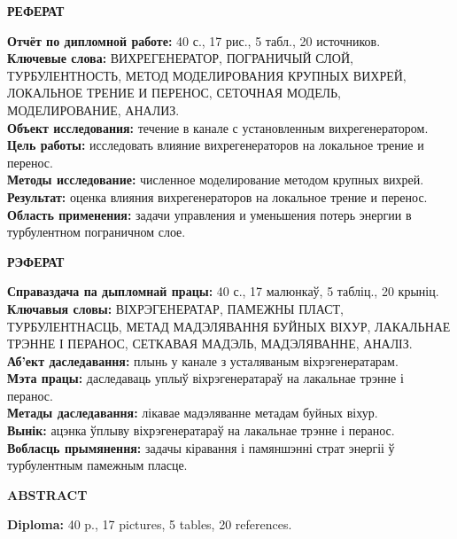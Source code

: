 \newpage
\tableofcontents
\newpage
\begin{center}
	\textbf{\MakeUppercase{реферат}}
\end{center}
\textbf{Отчёт по дипломной работе:} 40 с., 17 рис., 5 табл., 20 источников.\\
\textbf{Ключевые слова:} \MakeUppercase{вихрегенератор, пограничый слой, турбулентность, метод моделирования крупных вихрей, локальное трение и перенос, сеточная модель, моделирование, анализ}.\\
\textbf{Объект исследования:} течение в канале с установленным вихрегенератором.\\
\textbf{Цель работы:} исследовать влияние вихрегенераторов на локальное трение и перенос.\\
\textbf{Методы исследование:} численное моделирование методом крупных вихрей.\\
\textbf{Результат:} оценка влияния вихрегенераторов на локальное трение и перенос.\\
\textbf{Область применения:} задачи управления и уменьшения потерь энергии в турбулентном пограничном слое.\\
\newpage
\begin{center}
	\textbf{\MakeUppercase{рэферат}}
\end{center}
\textbf{Справаздача па дыпломнай працы:} 40 с., 17 малюнкаў, 5 табліц., 20 крыніц.\\
\textbf{Ключавыя словы:} \MakeUppercase{віхрэгенератар, памежны пласт, турбулентнасць, метад мадэлявання буйных віхур, лакальнае трэнне і перанос, сеткавая мадэль, мадэляванне, аналіз}.\\
\textbf{Аб'ект даследавання:} плынь у канале з усталяваным віхрэгенератарам.\\
\textbf{Мэта працы:} даследаваць уплыў віхрэгенератараў на лакальнае трэнне і перанос.\\
\textbf{Метады даследавання:} лікавае мадэляванне метадам буйных віхур.\\
\textbf{Вынік:} ацэнка ўплыву віхрэгенератараў на лакальнае трэнне і перанос.\\
\textbf{Вобласць прымянення:} задачы кіравання і памяншэнні страт энергіі ў турбулентным памежным пласце.\\
\newpage
\begin{center}
	\textbf{\MakeUppercase{abstract}}
\end{center}
\textbf{Diploma:} 40 p., 17 pictures, 5 tables, 20 references.\\
